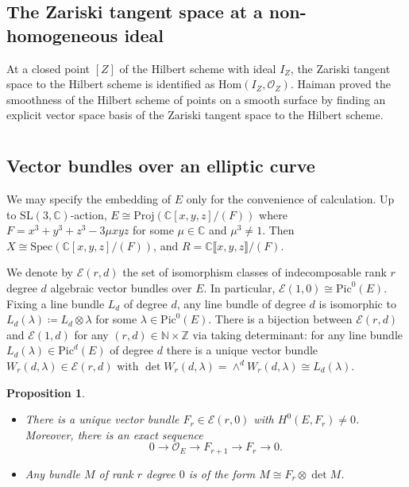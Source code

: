 \documentclass[12pt,oneside,reqno]{amsart}
\newtheorem{prop}[theorem]{Proposition}
\theoremstyle{definition}
\begin{document}
\subsection{The Zariski tangent space at a non-homogeneous ideal}
At a closed point $[Z]$ of the Hilbert scheme with ideal $I_Z$, the Zariski tangent space to the Hilbert scheme is identified as $\mathrm{Hom}(I_Z, \mathcal{O}_Z)$. Haiman proved the smoothness of the Hilbert scheme of points on a smooth surface by finding an explicit vector space basis of the Zariski tangent space to the Hilbert scheme. 

\section{}
\subsection{Vector bundles over an elliptic curve}
We may specify the embedding of $E$ only for the convenience of calculation. Up to $\mathrm{SL}(3, \mathbb{C})$-action, $E \cong \mathrm{Proj}(\mathbb{C}[x, y, z] / (F))$ where $F = x^3 + y^3 + z^3 - 3\mu xyz$ for some $\mu \in \mathbb{C}$ and $\mu^3 \neq 1$. Then $X \cong \mathrm{Spec}(\mathbb{C}[ x, y, z] / (F))$, and $R = \mathbb{C}\llbracket x, y, z\rrbracket / (F)$. 

We denote by $\mathcal{E}(r, d)$ the set of isomorphism classes of indecomposable rank $r$ degree $d$ algebraic vector bundles over $E$. In particular, $\mathcal{E}(1, 0) \cong \mathrm{Pic}^0(E)$. Fixing a line bundle $L_d$ of degree $d$, any line bundle of degree $d$ is isomorphic to $L_d(\lambda) \coloneqq L_d \otimes \lambda$ for some $\lambda \in \mathrm{Pic}^0(E)$. There is a bijection between $\mathcal{E}(r, d)$ and $\mathcal{E}(1, d)$ for any $(r, d) \in \mathbb{N} \times \mathbb{Z}$ via taking determinant: for any line bundle $L_d(\lambda) \in \mathrm{Pic}^d(E)$ of degree $d$ there is a unique vector bundle $W_{r}(d, \lambda) \in \mathcal{E}(r, d)$ with $\det W_{r}(d, \lambda) = \wedge^d W_{r}(d, \lambda) \cong L_d(\lambda)$. 

\begin{prop}
\begin{itemize}
\item[(1)] There is a unique vector bundle $F_r \in \mathcal{E}(r, 0)$ with $H^0(E, F_r) \neq 0$. Moreover, there is an exact sequence
\[
0 \to \mathcal{O}_E \to F_{r + 1} \to F_{r} \to 0.
\]
\item[(2)] Any bundle $M$ of rank $r$ degree $0$ is of the form $M \cong F_r \otimes \det M$. 
\end{itemize}
\end{prop}
\end{document}
